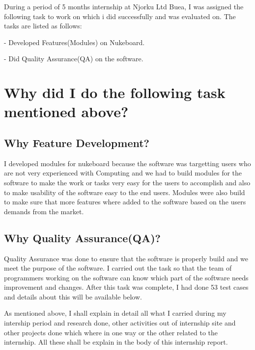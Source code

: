 During a period of 5 months internship at Njorku Ltd Buea, I was assigned the following task to work on which i did successfully and was evaluated on. The tasks are listed as follows:

- Developed Features(Modules) on Nukeboard.

- Did Quality Assurance(QA) on the software.


\section{Why did I do the following task mentioned above?}

\subsection{Why Feature Development?}

I developed modules for nukeboard because the software was targetting users who are not very experienced with Computing and we had to build modules for the software to make the work or tasks very easy for the users to accomplish and also to make usability of the software easy to the end users. Modules were also build to make sure that more features where added to the software based on the users demands from the market.

\subsection{Why Quality Assurance(QA)?}

Quality Assurance was done to ensure that the software is properly build and we meet the purpose of the software. I carried out the task so that the team of programmers working on the software can know which part of the software needs improvement and changes. After this task was complete, I had done 53 test cases and details about this will be available below.


As mentioned above, I shall explain in detail all what I carried during my intership period and research done, other activities out of internship site and other projects done which where in one way or the other related to the internship. All these shall be explain in the body of this internship report.